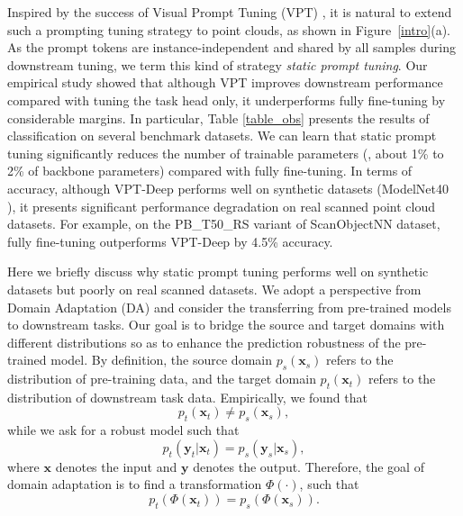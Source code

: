 \documentclass[10pt,twocolumn,letterpaper]{article}
\begin{document}
Inspired by the success of Visual Prompt Tuning (VPT) \cite{jia2022visual}, it is natural to extend such a prompting tuning strategy to point clouds, as shown in Figure~\ref{intro}(a). As the prompt tokens are instance-independent and shared by all samples during downstream tuning, we term this kind of strategy \emph{static prompt tuning}. Our empirical study showed that although VPT improves downstream performance compared with tuning the task head only, it underperforms fully fine-tuning by considerable margins. In particular, Table \ref{table_obs} presents the results of classification on several benchmark datasets. We can learn that static prompt tuning significantly reduces the number of trainable parameters (\ie, about 1\% to 2\% of backbone parameters) compared with fully fine-tuning. In terms of accuracy, although VPT-Deep performs well on synthetic datasets (\eg ModelNet40 \cite{wu20153d}), it presents significant performance degradation on real scanned point cloud datasets. For example, on the PB\_T50\_RS variant of ScanObjectNN \cite{uy2019revisiting} dataset, fully fine-tuning outperforms VPT-Deep by 4.5\% accuracy. 

Here we briefly discuss why static prompt tuning performs well on synthetic datasets but poorly on real scanned datasets. We adopt a perspective from Domain Adaptation (DA) \cite{aghajanyan2020intrinsic,ben2010theory,ben2006analysis,guo2022domain} and consider the transferring from pre-trained models to downstream tasks. Our goal is to bridge the source and target domains with different distributions so as 
 to enhance the prediction robustness of the pre-trained model. By definition, the source domain $p_s(\bm x_s)$ refers to the distribution of pre-training data, and the target domain $p_t(\bm x_t)$ refers to the distribution of downstream task data. Empirically, we found that 
\begin{equation}
  \label{eq5}
   p_t(\bm x_t) \ne  p_s(\bm x_s), 
\end{equation}
while we ask for a robust model such that 
\begin{equation}
  \label{eq6}
   p_t(\bm y_t|\bm x_t)=p_s(\bm y_s|\bm x_s),  
\end{equation}
where $\bm x$ denotes the input and $\bm y$ denotes the output. 
Therefore, the goal of domain adaptation is to find a transformation $\Phi(\cdot)$, such that 
\begin{equation}
  \label{eq7}
   p_t(\Phi(\bm x_t))=p_s(\Phi(\bm x_s)).
\end{equation}
\end{document}
